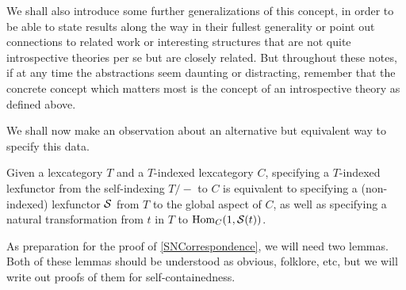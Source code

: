 We shall also introduce some further generalizations of this concept, in order to be able to state results along the way in their fullest generality or point out connections to related work or interesting structures that are not quite introspective theories per se but are closely related. But throughout these notes, if at any time the abstractions seem daunting or distracting, remember that the concrete concept which matters most is the concept of an introspective theory as defined above.

We shall now make an observation about an alternative but equivalent way to specify this data.

\begin{theorem}\label{SNCorrespondence}
Given a lexcategory $T$ and a $T$-indexed lexcategory $C$, specifying a $T$-indexed lexfunctor from the self-indexing $T/-$ to $C$ is equivalent to specifying a (non-indexed) lexfunctor $\mathcal{S}$ from $T$ to the global aspect of $C$, as well as specifying a natural transformation from $t$ in $T$ to $\operatorname{Hom}_C(1, \mathcal{S}(t))$.
\end{theorem}

As preparation for the proof of \cref{SNCorrespondence}, we will need two lemmas. Both of these lemmas should be understood as obvious, folklore, etc, but we will write out proofs of them for self-containedness.

